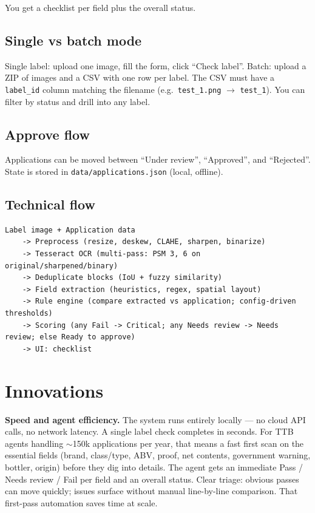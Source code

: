 \documentclass[11pt,a4paper]{article}
\begin{document}
You get a checklist per field plus the overall status.

\subsection{Single vs batch mode}

Single label: upload one image, fill the form, click ``Check label''. Batch: upload a ZIP of images and a CSV with one row per label. The CSV must have a \texttt{label\_id} column matching the filename (e.g.\ \texttt{test\_1.png} $\rightarrow$ \texttt{test\_1}). You can filter by status and drill into any label.

\subsection{Approve flow}

Applications can be moved between ``Under review'', ``Approved'', and ``Rejected''. State is stored in \texttt{data/applications.json} (local, offline).

\subsection{Technical flow}

\begin{lstlisting}
Label image + Application data
    -> Preprocess (resize, deskew, CLAHE, sharpen, binarize)
    -> Tesseract OCR (multi-pass: PSM 3, 6 on original/sharpened/binary)
    -> Deduplicate blocks (IoU + fuzzy similarity)
    -> Field extraction (heuristics, regex, spatial layout)
    -> Rule engine (compare extracted vs application; config-driven thresholds)
    -> Scoring (any Fail -> Critical; any Needs review -> Needs review; else Ready to approve)
    -> UI: checklist
\end{lstlisting}

\section{Innovations}

\textbf{Speed and agent efficiency.} The system runs entirely locally --- no cloud API calls, no network latency. A single label check completes in seconds. For TTB agents handling $\sim$150k applications per year, that means a fast first scan on the essential fields (brand, class/type, ABV, proof, net contents, government warning, bottler, origin) before they dig into details. The agent gets an immediate Pass / Needs review / Fail per field and an overall status. Clear triage: obvious passes can move quickly; issues surface without manual line-by-line comparison. That first-pass automation saves time at scale.
\end{document}
